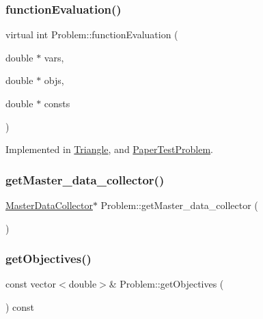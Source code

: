 \mbox{\label{classProblem_acd924a80df4422c5199748c714e9405c}} 
\subsubsection{\texorpdfstring{function\+Evaluation()}{functionEvaluation()}}
{\footnotesize\ttfamily virtual int Problem\+::function\+Evaluation (\begin{DoxyParamCaption}\item[{double $\ast$}]{vars,  }\item[{double $\ast$}]{objs,  }\item[{double $\ast$}]{consts }\end{DoxyParamCaption})\hspace{0.3cm}{\ttfamily [pure virtual]}}



Implemented in \mbox{\hyperlink{classTriangle_a9e95039d098fd61cce1a830b85ed7004}{Triangle}}, and \mbox{\hyperlink{classPaperTestProblem_a6db78df74d40f69a750b164caaca75c7}{Paper\+Test\+Problem}}.

\mbox{\label{classProblem_acf10e6a4a54da1aabea1fa8611e598dc}} 
\subsubsection{\texorpdfstring{get\+Master\+\_\+data\+\_\+collector()}{getMaster\_data\_collector()}}
{\footnotesize\ttfamily \mbox{\hyperlink{classMasterDataCollector}{Master\+Data\+Collector}}$\ast$ Problem\+::get\+Master\+\_\+data\+\_\+collector (\begin{DoxyParamCaption}{ }\end{DoxyParamCaption})}

\mbox{\label{classProblem_a64ffd22f18e26eba34013c81dc106212}} 
\subsubsection{\texorpdfstring{get\+Objectives()}{getObjectives()}}
{\footnotesize\ttfamily const vector$<$double$>$\& Problem\+::get\+Objectives (\begin{DoxyParamCaption}{ }\end{DoxyParamCaption}) const}



